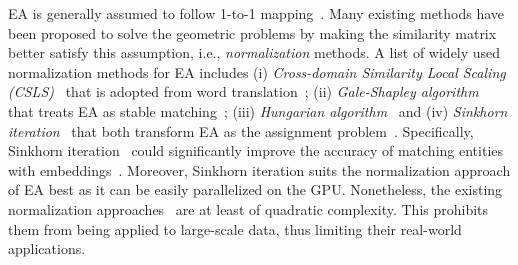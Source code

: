 EA is generally assumed to follow 1-to-1 mapping~\cite{MTransE17}.
Many existing methods have been proposed to solve the geometric problems by making the similarity matrix better satisfy this assumption, i.e., \emph{normalization} methods.
A list of widely used normalization methods for EA includes (i) \emph{Cross-domain Similarity Local Scaling (CSLS)}~\cite{CSLS} that is adopted from word translation~\cite{TransEdge19,EVA20, RREA20, EASY21}; (ii) \emph{Gale-Shapley algorithm}~\cite{GaleShapley} that treats EA as stable matching~\cite{CEAFF20,CEAFF21}; (iii) \emph{Hungarian algorithm}~\cite{Hungarian1955} and (iv) \emph{Sinkhorn iteration}~\cite{Sinkhorn13} that both transform EA as the assignment problem~\cite{DGMC20, SEU21, EASY21}.
Specifically, Sinkhorn iteration~\cite{Sinkhorn13} could significantly improve the accuracy of matching entities with embeddings~\cite{EASY21, SEU21}. Moreover, Sinkhorn iteration suits the normalization approach of EA best as it can be easily parallelized on the GPU. %
Nonetheless, the existing normalization approaches~\cite{CSLS,Sinkhorn13, GaleShapley, Hungarian1955} are at least of quadratic complexity. This prohibits them from being applied to large-scale data, thus limiting their real-world applications.

